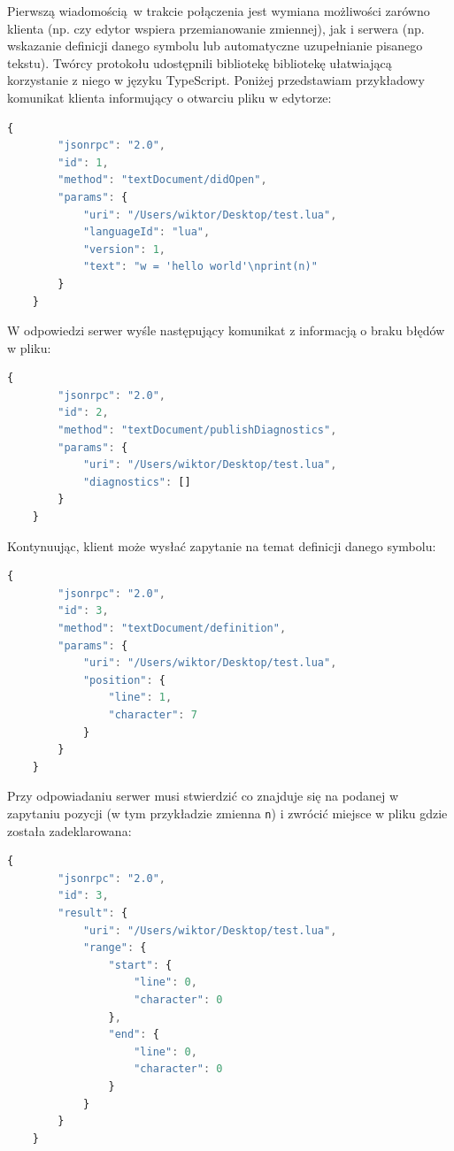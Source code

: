 Pierwszą wiadomością w trakcie połączenia jest wymiana możliwości zarówno klienta (np. czy edytor wspiera przemianowanie zmiennej), jak i serwera (np. wskazanie definicji danego symbolu lub automatyczne uzupełnianie pisanego tekstu). Twórcy protokołu udostępnili bibliotekę bibliotekę ułatwiającą korzystanie z niego w języku TypeScript. Poniżej przedstawiam przykładowy komunikat klienta informujący o otwarciu pliku w edytorze:

\begin{lstlisting}[language=JavaScript]
    {
        "jsonrpc": "2.0",
        "id": 1,
        "method": "textDocument/didOpen",
        "params": {
            "uri": "/Users/wiktor/Desktop/test.lua",
            "languageId": "lua",
            "version": 1,
            "text": "w = 'hello world'\nprint(n)"
        }
    }
\end{lstlisting}

W odpowiedzi serwer wyśle następujący komunikat z informacją o braku błędów w pliku:

\begin{lstlisting}[language=JavaScript]
    {
        "jsonrpc": "2.0",
        "id": 2,
        "method": "textDocument/publishDiagnostics",
        "params": {
            "uri": "/Users/wiktor/Desktop/test.lua",
            "diagnostics": []
        }
    }
\end{lstlisting}

Kontynuując, klient może wysłać zapytanie na temat definicji danego symbolu:

\begin{lstlisting}[language=JavaScript]
    {
        "jsonrpc": "2.0",
        "id": 3,
        "method": "textDocument/definition",
        "params": {
            "uri": "/Users/wiktor/Desktop/test.lua",
            "position": {
                "line": 1,
                "character": 7
            }
        }
    }
\end{lstlisting}

Przy odpowiadaniu serwer musi stwierdzić co znajduje się na podanej w zapytaniu pozycji (w tym przykładzie zmienna \texttt{n}) i zwrócić miejsce w pliku gdzie została zadeklarowana:

\begin{lstlisting}[language=JavaScript]
    {
        "jsonrpc": "2.0",
        "id": 3,
        "result": {
            "uri": "/Users/wiktor/Desktop/test.lua",
            "range": {
                "start": {
                    "line": 0,
                    "character": 0
                },
                "end": {
                    "line": 0,
                    "character": 0
                }
            }
        }
    }
\end{lstlisting}

